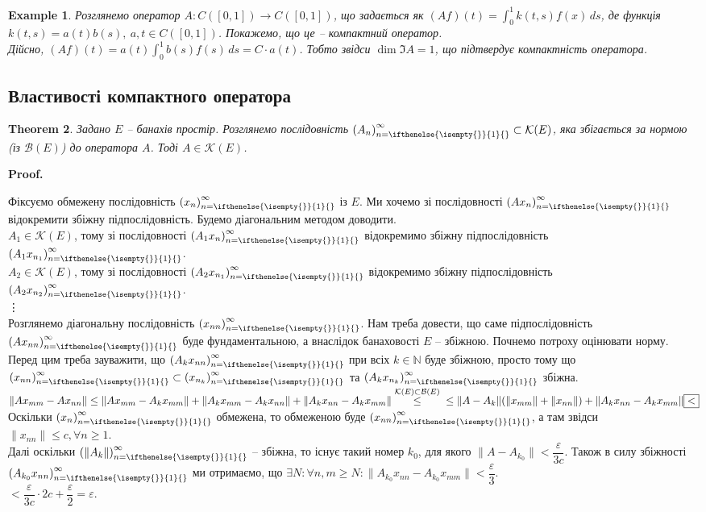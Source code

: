\documentclass[a4paper, 10pt]{article}
\makeatletter
\theoremstyle{theoremdd}
\newtheorem{theorem}{Theorem}[subsection]
\theoremstyle{theoremdd}
\theoremstyle{theoremdd}
\theoremstyle{theoremdd}
\newtheorem{example}[theorem]{Example}
\theoremstyle{theoremdd}
\theoremstyle{theoremdd}
\theoremstyle{theoremdd}
\theoremstyle{theoremdd}
\newcommand{\sequence}[2][]{\left({#2}\right)_{n=\ifthenelse{\isempty{#1}}{1}{#1}}^{\infty}}
\renewenvironment{proof}[1][Proof.\\]{\par
\pushQED{\hfill \qed}%
\normalfont \topsep6\p@\@plus6\p@\relax
\trivlist
\item\relax
{\bfseries
#1\@addpunct{.}}\hspace\labelsep\ignorespaces
}{%
\popQED\endtrivlist\@endpefalse
}
\makeatother
\begin{document}
\begin{example}
Розглянемо оператор $A \colon C([0,1]) \to C([0,1])$, що задається як $(Af)(t) = \displaystyle\int_0^1 k(t,s) f(x)\,ds$, де функція $k(t,s) = a(t)b(s),\ a,t \in C([0,1])$. Покажемо, що це -- компактний оператор.\\
Дійсно, $(Af)(t) = a(t) \displaystyle\int_0^1 b(s)f(s)\,ds = C \cdot a(t)$. Тобто звідси $\dim \Im A = 1$, що підтвердує компактність оператора.
\end{example}

\subsection{Властивості компактного оператора}
\begin{theorem}
\label{convergence_to_compact}
Задано $E$ -- банахів простір. Розглянемо послідовність $\sequence{A_n} \subset \mathcal{K}(E)$, яка збігається за нормою (із $\mathcal{B}(E)$) до оператора $A$. Тоді $A \in \mathcal{K}(E)$.
\end{theorem}

\begin{proof}
Фіксуємо обмежену послідовність $\sequence{x_n}$ із $E$. Ми хочемо зі послідовності $\sequence{A x_n}$ відокремити збіжну підпослідовність. Будемо діагональним методом доводити.\\
$A_1 \in \mathcal{K}(E)$, тому зі послідовності $\sequence{A_1x_n}$ відокремимо збіжну підпослідовність $\sequence{A_1 x_{n_1}}$.\\
$A_2 \in \mathcal{K}(E)$, тому зі послідовності $\sequence{A_2x_{n_1}}$ відокремимо збіжну підпослідовність $\sequence{A_2 x_{n_2}}$.\\
\vdots \\
Розглянемо діагональну послідовність $\sequence{x_{nn}}$. Нам треба довести, що саме підпослідовність $\sequence{A x_{nn}}$ буде фундаментальною, а внаслідок банаховості $E$ -- збіжною. Почнемо потроху оцінювати норму.\\
Перед цим треба зауважити, що $\sequence{A_k x_{nn}}$ при всіх $k \in \mathbb{N}$ буде збіжною, просто тому що $\sequence{x_{nn}} \subset \sequence{x_{n_k}}$ та $\sequence{A_k x_{n_k}}$ збіжна.\\
$\| A x_{mm} - A x_{nn} \| \leq \|A x_{mm} - A_k x_{mm} \| + \| A_k x_{mm} - A_k x_{nn} \| + \|A_k x_{nn} - A_k x_{mm} \| \overset{\mathcal{K}(E) \subset \mathcal{B}(E)}{\leq} \\
\leq \|A - A_k\| (\|x_{mm}\| + \|x_{nn}\|) + \| A_k x_{nn} - A_k x_{mm} \| \boxed{<}$\\
Оскільки $\sequence{x_n}$ обмежена, то обмеженою буде $\sequence{x_{nn}}$, а там звідси $\|x_{nn}\| \leq c, \forall n \geq 1$.\\
Далі оскільки $\sequence{\|A_k\|}$ -- збіжна, то існує такий номер $k_0$, для якого $\|A - A_{k_0}\| < \dfrac{\varepsilon}{3c}$. Також в силу збіжності $\sequence{A_{k_0} x_{nn}}$ ми отримаємо, що $\exists N: \forall n,m \geq N: \|A_{k_0} x_{nn} - A_{k_0} x_{mm} \| < \dfrac{\varepsilon}{3}$.\\
$\boxed{<} \dfrac{\varepsilon}{3c} \cdot 2c + \dfrac{\varepsilon}{2} = \varepsilon$.
\end{proof}
\end{document}
